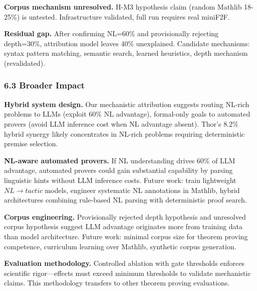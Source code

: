 \textbf{Corpus mechanism unresolved.} H-M3 hypothesis claim (random Mathlib 18-25\%) is untested. Infrastructure validated, full run requires real miniF2F.

\textbf{Residual gap.} After confirming NL=60\% and provisionally rejecting depth=30\%, attribution model leaves 40\% unexplained. Candidate mechanisms: syntax pattern matching, semantic search, learned heuristics, depth mechanism (revalidated).

\subsubsection{6.3 Broader Impact}

\textbf{Hybrid system design.} Our mechanistic attribution suggests routing NL-rich problems to LLMs (exploit 60\% NL advantage), formal-only goals to automated provers (avoid LLM inference cost when NL advantage absent). Thor's 8.2\% hybrid synergy likely concentrates in NL-rich problems requiring deterministic premise selection.

\textbf{NL-aware automated provers.} If NL understanding drives 60\% of LLM advantage, automated provers could gain substantial capability by parsing linguistic hints without LLM inference costs. Future work: train lightweight $NL\rightarrow tactic$ models, engineer systematic NL annotations in Mathlib, hybrid architectures combining rule-based NL parsing with deterministic proof search.

\textbf{Corpus engineering.} Provisionally rejected depth hypothesis and unresolved corpus hypothesis suggest LLM advantage originates more from training data than model architecture. Future work: minimal corpus size for theorem proving competence, curriculum learning over Mathlib, synthetic corpus generation.

\textbf{Evaluation methodology.} Controlled ablation with gate thresholds enforces scientific rigor---effects must exceed minimum thresholds to validate mechanistic claims. This methodology transfers to other theorem proving evaluations.
